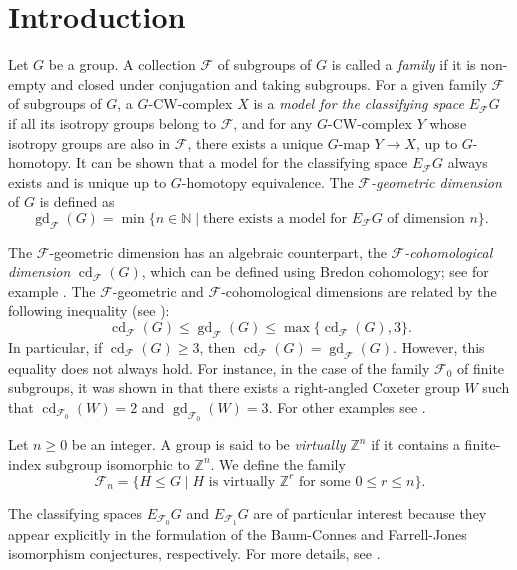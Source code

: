 \documentclass[a4paper,12pt,leqno]{amsart}
\theoremstyle{definition}
\newcommand{\calF}{{\mathcal F}}
\DeclareMathOperator{\cd}{cd}
\DeclareMathOperator{\gd}{gd}
\begin{document}


\section{Introduction}
\noindent Let \( G \) be a group. A collection \( \calF \) of subgroups of \( G \) is called a \emph{family} if it is non-empty and closed under conjugation and taking subgroups. For a given family $\calF$ of subgroups of $G$, a \( G \)-CW-complex \( X \) is  a \emph{model for the classifying space} \( E_{\calF}G \) if all its isotropy groups belong to \( \calF \), and for any \( G \)-CW-complex \( Y \) whose isotropy groups are also in \( \calF \), there exists a unique \( G \)-map \( Y \to X \), up to \( G \)-homotopy. It can be shown that a model for the classifying space \( E_{\calF}G \) always exists and is unique up to \( G \)-homotopy equivalence. The \emph{\( \calF \)-geometric dimension} of \( G \) is defined as
\[
\gd_{\calF}(G) = \min\{n \in \mathbb{N} \mid \text{there exists a model for } E_{\calF}G \text{ of dimension } n\}.
\]

The \( \calF \)-geometric dimension has an algebraic counterpart, the \emph{\( \calF \)-cohomological dimension} \( \cd_{\calF}(G) \), which can be defined using Bredon cohomology; see for example \cite{MV03}. The $\calF$-geometric and $\calF$-cohomological dimensions are related by the following inequality (see \cite[Theorem 0.1]{LM00}):
\[
\cd_{\calF}(G) \leq \gd_{\calF}(G) \leq \max\{\cd_{\calF}(G), 3\}.
\]
In particular, if \( \cd_{\calF}(G) \geq 3 \), then \( \cd_{\calF}(G) = \gd_{\calF}(G) \). However, this equality does not always hold. For instance, in the case of the family \( \calF_0 \) of finite subgroups, it was shown in \cite{NB} that there exists a right-angled Coxeter group \( W \) such that \( \cd_{\calF_0}(W) = 2 \) and \( \gd_{\calF_0}(W) = 3 \). For other examples see \cite{SS19}.

Let \( n \geq 0 \) be an integer. A group is said to be \emph{virtually \( \mathbb{Z}^n \)} if it contains a finite-index subgroup isomorphic to \( \mathbb{Z}^n \). We define the family
\[
\calF_n = \{H \leq G \mid H \text{ is virtually } \mathbb{Z}^r \text{ for some } 0 \leq r \leq n\}.
\]

The classifying spaces \( E_{\calF_0}G \) and \( E_{\calF_1}G \) are of particular interest because they appear explicitly in the formulation of the Baum-Connes and Farrell-Jones isomorphism conjectures, respectively. For more details, see \cite{LR05}.
\end{document}
